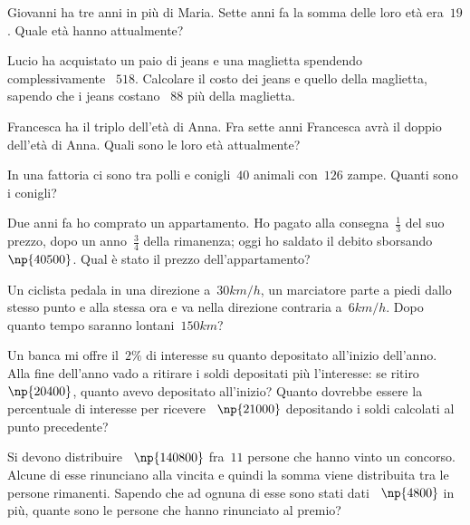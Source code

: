 \begin{multicols}{2}
\begin{esercizio}[\Ast]
Giovanni ha tre anni in più di Maria. Sette anni fa la somma delle loro età era~$19$. Quale età hanno attualmente?
\end{esercizio}

\begin{esercizio}[\Ast]
Lucio ha acquistato un paio di jeans e una maglietta spendendo complessivamente \officialeuro~$518$. Calcolare il costo dei jeans e quello della maglietta, sapendo che i jeans costano \officialeuro~$88$ più della maglietta.
\end{esercizio}

\begin{esercizio}[\Ast]
Francesca ha il triplo dell'età di Anna. Fra sette anni Francesca avrà il doppio dell'età di Anna. Quali sono le loro età attualmente?
\end{esercizio}

\begin{esercizio}[\Ast]
In una fattoria ci sono tra polli e conigli~$40$ animali con~$126$ zampe. Quanti sono i conigli?
\end{esercizio}

\begin{esercizio}[\Ast]
Due anni fa ho comprato un appartamento. Ho pagato alla consegna~$\frac{1}{3}$ del suo prezzo, dopo un anno~$\frac{3}{4}$ della rimanenza; oggi ho saldato il debito sborsando \officialeuro~$\np{40500}$. Qual è stato il prezzo dell'appartamento?
\end{esercizio}

\begin{esercizio}[\Ast]
Un ciclista pedala in una direzione a~$30\unit{km/h}$, un marciatore parte a piedi dallo stesso punto e alla stessa ora e va nella direzione contraria a~$6\unit{km/h}$. Dopo quanto tempo saranno lontani~$150\unit{km}$?
\end{esercizio}

\begin{esercizio}[\Ast]
Un banca mi offre il~$2\%$ di interesse su quanto depositato all'inizio dell'anno. Alla fine dell'anno vado a ritirare i soldi depositati più l'interesse: se ritiro \officialeuro~$\np{20400}$, quanto avevo depositato all'inizio? Quanto dovrebbe essere la percentuale di interesse per ricevere \officialeuro~$\np{21000}$ depositando i soldi calcolati al punto precedente?
\end{esercizio}

\begin{esercizio}[\Ast]
Si devono distribuire \officialeuro~$\np{140800}$ fra~$11$ persone che hanno vinto un concorso. Alcune di esse rinunciano alla vincita e quindi la somma viene distribuita tra le persone rimanenti. Sapendo che ad ognuna di esse sono stati dati \officialeuro~$\np{4800}$ in più, quante sono le persone che hanno rinunciato al premio?
\end{esercizio}


\end{multicols}

